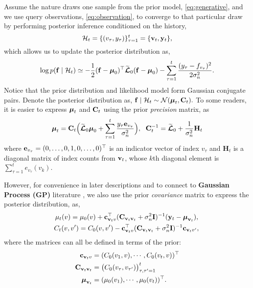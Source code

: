 Assume the nature draws one sample from the prior model, \eqref{eq:generative}, and we use query observations, \eqref{eq:observation}, to converge to that particular draw 
by performing posterior inference conditioned on the history, 
\begin{equation*}
	\mathcal{H}_t = \{(v_\tau, y_\tau)\}_{\tau=1}^t
	= \{\mathbf{v}_t, \mathbf y_t\},
\end{equation*}
which allows us to update the posterior distribution as,
\begin{equation*}
	\log p(\mathbf{f}\mid\mathcal{H}_t) \simeq
	 - \frac{1}{2}(\mathbf{f}-\boldsymbol \mu_0)^\top \widetilde{{\boldsymbol{\mathcal L}}}_0 (\mathbf{f}-\boldsymbol \mu_0) 
	- \sum_{\tau=1}^t \frac{(y_\tau-f_{v_\tau})^2}{2\sigma_n^2}.
\end{equation*}
Notice that the prior distribution and likelihood model form Gaussian conjugate pairs. Denote the posterior distribution as, 
$
\mathbf{f} \mid \mathcal{H}_t \sim \mathcal{N}(\boldsymbol \mu_t, {\mathbf C}_t).
$
To some readers, it is easier to express $\boldsymbol \mu_t$ and ${\mathbf C}_t$ using the prior \emph{precision} matrix, as
\begin{equation}
	\boldsymbol \mu_t = {\mathbf C}_t
	\Bigl(\widetilde{{\boldsymbol{\mathcal L}}}_0\boldsymbol \mu_0 +  \sum_{\tau=1}^t \frac{y_\tau \mathbf{e}_{v_\tau} }{\sigma_n^2}\Bigr),
	\,\,\;
	{\mathbf C}_t^{-1} = \widetilde{{\boldsymbol{\mathcal L}}}_0 + \frac{1}{\sigma_n^2}\mathbf{H}_t
	\label{eq:post_prec}
\end{equation}
where $\mathbf{e}_{v_\tau}=(0,\dotsc,0,1,0,\dotsc,0)^\top$ is an indicator vector of index $v_\tau$ and $\mathbf{H}_t$
is a diagonal matrix of index counts from $\mathbf{v}_t$, whose $k$th diagonal element is $\sum_{\tau=1}^t e_{v_\tau}(v_k)$. 


However, for convenience in later descriptions and to connect to \textbf{ Gaussian Process (GP) } literature \citep{gpml}, we also use the prior \emph{covariance} matrix to express the posterior distribution, as,
\begin{align}
	\begin{split}
		&\mu_t(v) = \mu_0(v) + \mathbf{c}_{\mathbf{v}_t v}^\top ({\mathbf C}_{\mathbf{v}_t\mathbf{v}_t} + \sigma_n^2 \mathbf I)^{-1} (\mathbf y_t - \boldsymbol \mu_{\mathbf{v}_t}),
		\\
		&\! C_t(v,v') = C_0(v,v') - \mathbf{c}_{\mathbf{v}_t v}^\top ({\mathbf C}_{\mathbf{v}_t\mathbf{v}_t} + \sigma_n^2 \mathbf I)^{-1} \mathbf{c}_{\mathbf{v}_t v'},
	\end{split}
		\label{eq:var_update}
\end{align}
where the matrices can all be defined in terms of the prior:
\begin{align*}
	\mathbf{c}_{\mathbf{v}_t v} &= (C_0(v_1,v) ,\cdots, C_0(v_t,v))^\top\\ 
	{\mathbf C}_{\mathbf{v}_t \mathbf{v}_t} &= \bigl( C_0(v_\tau,v_{\tau'}) \bigr)_{\tau,\tau'=1}^t \\
	\boldsymbol \mu_{\mathbf{v}_t} &= (\mu_0(v_1),\cdots, \mu_0(v_t))^\top.
\end{align*}

